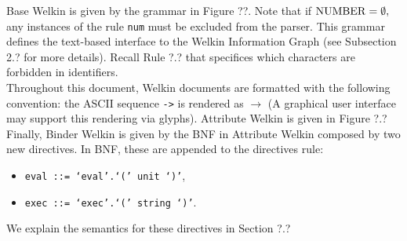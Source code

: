 Base Welkin is given by the grammar in Figure ??. Note that if $\mathrm{NUMBER}= \emptyset,$ any instances of the rule \texttt{num} must be excluded from the parser. This grammar defines the text-based interface to the Welkin Information Graph (see Subsection 2.? for more details). Recall Rule ?.? that specifices which characters are forbidden in identifiers.
\\ Throughout this document, Welkin documents are formatted with the following convention: the ASCII sequence \texttt{->} is rendered as $\to$ (A graphical user interface may support this rendering via glyphs). %
Attribute Welkin is given in Figure ?.?
Finally, Binder Welkin is given by the BNF in Attribute Welkin composed by two new directives. In BNF, these are appended to the directives rule:
\begin{itemize}
	\item \texttt{eval ::= `eval'.`(' unit `)'},
	\item \texttt{exec ::= `exec'.`(' string `)'}.
\end{itemize}
We explain the semantics for these directives in Section ?.?


